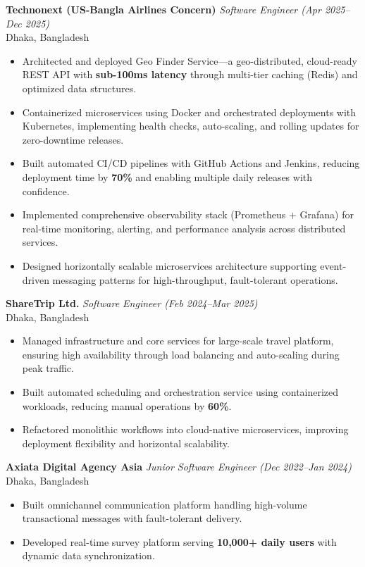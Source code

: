 \documentclass[11pt,a4paper]{article}
\begin{document}
\textbf{Technonext (US-Bangla Airlines Concern)} \hfill \textit{Software Engineer (Apr 2025--Dec 2025)} \\
Dhaka, Bangladesh
\begin{itemize}[leftmargin=*,noitemsep]
    \item Architected and deployed Geo Finder Service—a geo-distributed, cloud-ready REST API with \textbf{sub-100ms latency} through multi-tier caching (Redis) and optimized data structures.
    \item Containerized microservices using Docker and orchestrated deployments with Kubernetes, implementing health checks, auto-scaling, and rolling updates for zero-downtime releases.
    \item Built automated CI/CD pipelines with GitHub Actions and Jenkins, reducing deployment time by \textbf{70\%} and enabling multiple daily releases with confidence.
    \item Implemented comprehensive observability stack (Prometheus + Grafana) for real-time monitoring, alerting, and performance analysis across distributed services.
    \item Designed horizontally scalable microservices architecture supporting event-driven messaging patterns for high-throughput, fault-tolerant operations.
\end{itemize}

\textbf{ShareTrip Ltd.} \hfill \textit{Software Engineer (Feb 2024--Mar 2025)} \\
Dhaka, Bangladesh
\begin{itemize}[leftmargin=*,noitemsep]
    \item Managed infrastructure and core services for large-scale travel platform, ensuring high availability through load balancing and auto-scaling during peak traffic.
    \item Built automated scheduling and orchestration service using containerized workloads, reducing manual operations by \textbf{60\%}.
    \item Refactored monolithic workflows into cloud-native microservices, improving deployment flexibility and horizontal scalability.
\end{itemize}

\textbf{Axiata Digital Agency Asia} \hfill \textit{Junior Software Engineer (Dec 2022--Jan 2024)} \\
Dhaka, Bangladesh
\begin{itemize}[leftmargin=*,noitemsep]
    \item Built omnichannel communication platform handling high-volume transactional messages with fault-tolerant delivery.
    \item Developed real-time survey platform serving \textbf{10,000+ daily users} with dynamic data synchronization.
\end{itemize}
\end{document}

